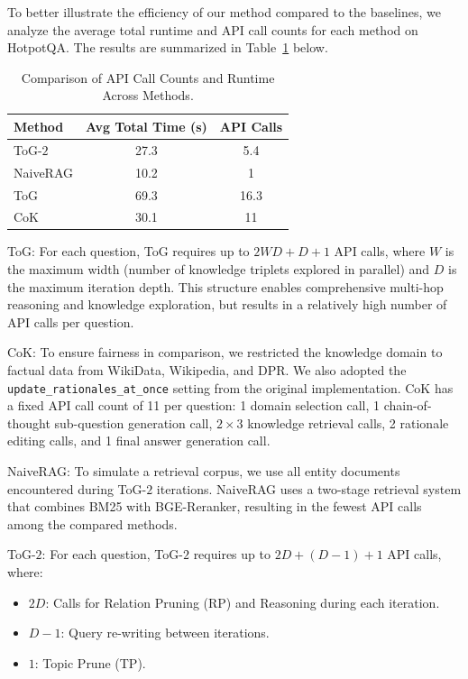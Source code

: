 \documentclass{article} %
\begin{document}
To better illustrate the efficiency of our method compared to the baselines, we analyze the average total runtime and API call counts for each method on HotpotQA. The results are summarized in Table~\ref{tab:api-runtime-comparison} below.
\begin{table}[ht]
\centering
\begin{tabular}{lcc}
\toprule
\textbf{Method}   & \textbf{Avg Total Time (s)} & \textbf{API Calls} \\ 
\midrule
ToG-$2$           & 27.3                        & 5.4               \\ 
NaiveRAG          & 10.2                        & 1                 \\ 
ToG               & 69.3                        & 16.3              \\ 
CoK               & 30.1                        & 11                \\ 
\bottomrule
\end{tabular}
\caption{Comparison of API Call Counts and Runtime Across Methods.}
\label{tab:api-runtime-comparison}
\end{table}
ToG: For each question, ToG requires up to \( 2WD + D + 1\) API calls, where \( W \) is the maximum width (number of knowledge triplets explored in parallel) and \( D \) is the maximum iteration depth. This structure enables comprehensive multi-hop reasoning and knowledge exploration, but results in a relatively high number of API calls per question.

CoK: To ensure fairness in comparison, we restricted the knowledge domain to factual data from WikiData, Wikipedia, and DPR. We also adopted the \texttt{update\_rationales\_at\_once} setting from the original implementation. CoK has a fixed API call count of 11 per question: 1 domain selection call, 1 chain-of-thought sub-question generation call, $2 \times 3$ knowledge retrieval calls, 2 rationale editing calls, and 1 final answer generation call.

NaiveRAG: To simulate a retrieval corpus, we use all entity documents encountered during ToG-$2$ iterations. NaiveRAG uses a two-stage retrieval system that combines BM25 with BGE-Reranker, resulting in the fewest API calls among the compared methods.

ToG-$2$: For each question, ToG-$2$ requires up to \( 2D + (D-1)+1 \) API calls, where:
\begin{itemize}
    \item \( 2D \): Calls for Relation Pruning (RP) and Reasoning during each iteration.
    \item \( D-1 \): Query re-writing between iterations.
    \item \( 1 \): Topic Prune (TP).
\end{itemize}
\end{document}
